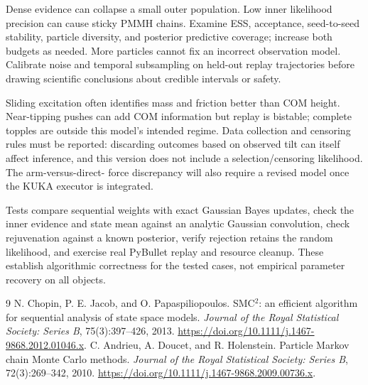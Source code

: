 \documentclass[11pt]{article}
\begin{document}
Dense evidence can collapse a small outer population. Low inner
likelihood precision can cause sticky PMMH chains. Examine ESS,
acceptance, seed-to-seed stability, particle diversity, and posterior
predictive coverage; increase both budgets as needed. More particles
cannot fix an incorrect observation model. Calibrate noise and temporal
subsampling on held-out replay trajectories before drawing scientific
conclusions about credible intervals or safety.

Sliding excitation often identifies mass and friction better than COM
height. Near-tipping pushes can add COM information but replay is
bistable; complete topples are outside this model's intended regime.
Data collection and censoring rules must be reported: discarding outcomes
based on observed tilt can itself affect inference, and this version
does not include a selection/censoring likelihood. The arm-versus-direct-
force discrepancy will also require a revised model once the KUKA
executor is integrated.

Tests compare sequential weights with exact Gaussian Bayes updates,
check the inner evidence and state mean against an analytic Gaussian
convolution, check rejuvenation against a known posterior, verify
rejection retains the random likelihood, and exercise real PyBullet
replay and resource cleanup. These establish algorithmic correctness
for the tested cases, not empirical parameter recovery on all objects.

\begin{thebibliography}{9}
 N. Chopin, P. E. Jacob, and O. Papaspiliopoulos.
SMC$^2$: an efficient algorithm for sequential analysis of state space
models. \emph{Journal of the Royal Statistical Society: Series B},
75(3):397--426, 2013. \url{https://doi.org/10.1111/j.1467-9868.2012.01046.x}.
 C. Andrieu, A. Doucet, and R. Holenstein.
Particle Markov chain Monte Carlo methods.
\emph{Journal of the Royal Statistical Society: Series B},
72(3):269--342, 2010. \url{https://doi.org/10.1111/j.1467-9868.2009.00736.x}.
\end{thebibliography}
\end{document}
